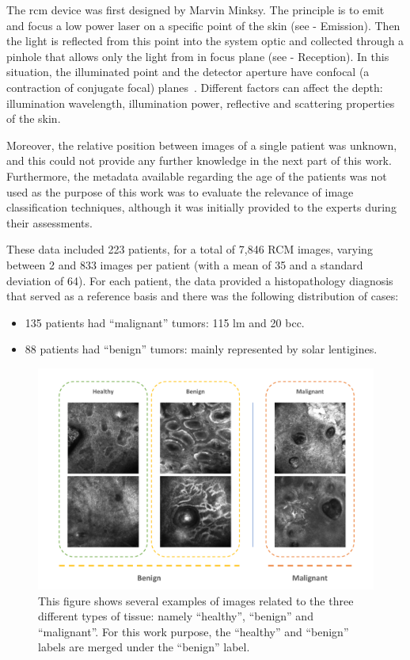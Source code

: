 \documentclass[journal,article,submit,moreauthors,pdftex, applsci]{Definitions/mdpi}
\begin{document}
The \ac{rcm} device was first designed by Marvin Minksy. The principle is to emit and focus a low power laser on a specific point of the skin (see  - Emission). Then the light is reflected from this point into the system optic and collected through a pinhole that allows only the light from in focus plane (see  - Reception). In this situation, the illuminated point and the detector aperture have confocal (a contraction of conjugate focal) planes~\cite{Nehal2008a}. Different factors can affect the depth: illumination wavelength, illumination power, reflective and scattering properties of the skin.\par
Moreover, the relative position between images of a single patient was unknown, and this could not provide any further knowledge in the next part of this work. Furthermore, the metadata available regarding the age of the patients was not used as the purpose of this work was to evaluate the relevance of image classification techniques, although it was initially provided to the experts during their assessments.\par
These data included 223 patients, for a total of 7,846 RCM images, varying between 2 and 833 images per patient (with a mean of 35 and a standard deviation of 64). For each patient, the data provided a histopathology diagnosis that served as a reference basis and there was the following distribution of cases:
\begin{itemize}
\item 135 patients had “malignant” tumors: 115 \ac{lm} and 20 \ac{bcc}.
\item 88 patients had “benign” tumors: mainly represented by solar lentigines.
\end{itemize}\par
\begin{figure}[H]
    \begin{center}
        \includegraphics[width=\linewidth]{Figures/Data.pdf}
        \caption{This figure shows several examples of images related to the three different types of tissue: namely “healthy”, “benign” and “malignant”. For this work purpose, the “healthy” and “benign” labels are merged under the “benign” label.}
        \label{fig:data}
    \end{center} 
\end{figure}\par
\end{document}
